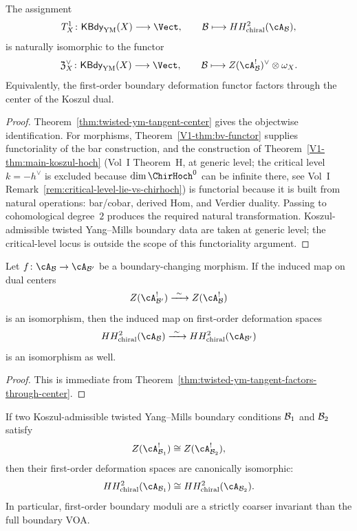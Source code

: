\begin{theorem}
The assignment
\[
T^1_X \colon \mathsf{KBdy}_{\mathrm{YM}}(X) \longrightarrow \Vect,
\qquad
\cB \longmapsto HH^2_{\mathrm{chiral}}(\cA_{\cB}),
\]
is naturally isomorphic to the functor
\[
\mathfrak{Z}^{\vee}_{X} \colon \mathsf{KBdy}_{\mathrm{YM}}(X) \longrightarrow \Vect,
\qquad
\cB \longmapsto Z(\cA_{\cB}^!)^{\vee} \otimes \omega_X.
\]
Equivalently, the first-order boundary deformation functor factors through the center of
the Koszul dual.
\end{theorem}

\begin{proof}
Theorem~\ref{thm:twisted-ym-tangent-center} gives the objectwise identification.
For morphisms, Theorem~\ref*{V1-thm:bv-functor} supplies functoriality of the bar construction,
and the construction of Theorem~\ref*{V1-thm:main-koszul-hoch} (Vol~I Theorem~H, at generic
level; the critical level $k = -h^\vee$ is excluded because $\dim \ChirHoch^0$ can be infinite
there, see Vol~I Remark~\ref*{rem:critical-level-lie-vs-chirhoch}) is functorial because it is
built from natural operations: bar/cobar, derived \(\mathrm{Hom}\), and Verdier duality.
Passing to cohomological degree~$2$ produces the required natural transformation. Koszul-admissible
twisted Yang--Mills boundary data are taken at generic level; the critical-level locus is outside
the scope of this functoriality argument.
\end{proof}

\begin{corollary}
Let $f \colon \cA_{\cB} \to \cA_{\cB'}$ be a boundary-changing morphism.
If the induced map on dual centers
\[
Z(\cA_{\cB'}^!) \xrightarrow{\ \sim\ } Z(\cA_{\cB}^!)
\]
is an isomorphism, then the induced map on first-order deformation spaces
\[
HH^2_{\mathrm{chiral}}(\cA_{\cB}) \xrightarrow{\ \sim\ } HH^2_{\mathrm{chiral}}(\cA_{\cB'})
\]
is an isomorphism as well.
\end{corollary}

\begin{proof}
This is immediate from Theorem~\ref{thm:twisted-ym-tangent-factors-through-center}.
\end{proof}

\begin{corollary}
If two Koszul-admissible twisted Yang--Mills boundary conditions $\mathcal{B}_1$ and $\mathcal{B}_2$ satisfy
\[
Z(\cA_{\cB_1}^!) \cong Z(\cA_{\cB_2}^!),
\]
then their first-order deformation spaces are canonically isomorphic:
\[
HH^2_{\mathrm{chiral}}(\cA_{\cB_1}) \cong HH^2_{\mathrm{chiral}}(\cA_{\cB_2}).
\]
In particular, first-order boundary moduli are a strictly coarser invariant than the full
boundary VOA.
\end{corollary}

